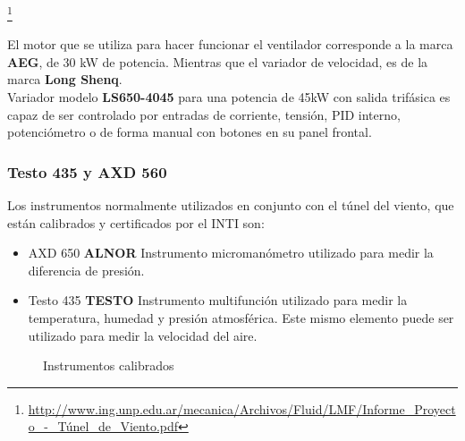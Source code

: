 			\footnote{\url{http://www.ing.unp.edu.ar/mecanica/Archivos/Fluid/LMF/Informe_Proyecto_-_Túnel_de_Viento.pdf}}
	\begin{minipage}[t]{.5\textwidth}
		
El motor que se utiliza para hacer funcionar el ventilador corresponde a la marca \textbf{AEG}, de 30 kW de potencia. Mientras que el variador de velocidad, es de la marca \textbf{Long Shenq}. \\
Variador modelo \textbf{LS650-4045} para una potencia de 45kW con salida trifásica es capaz de ser controlado por entradas de corriente, tensión, PID interno, potenciómetro o de forma manual con botones en su panel frontal.
	\end{minipage}	
	\begin{minipage}[t]{.5\textwidth}
		\centering{}
		\label{fig:LS650}
	\end{minipage}

		
	\subsubsection{Testo 435 y AXD 560}
	Los instrumentos normalmente utilizados en conjunto con el túnel del viento, que están calibrados y certificados por el INTI son:
\begin{itemize}
	\item AXD 650 \textbf{ALNOR} 
		\subitem Instrumento micromanómetro utilizado para medir la diferencia de presión.
	\item Testo 435 \textbf{TESTO}
	\subitem Instrumento multifunción utilizado para medir la temperatura, humedad y presión atmosférica. Este mismo elemento puede ser utilizado para medir la velocidad del aire.
	
\end{itemize}	   		
		
\begin{figure}[htbp]
	\centering
	\caption{Instrumentos calibrados} \label{fig:instr}
\end{figure}		
		
		
		\newpage